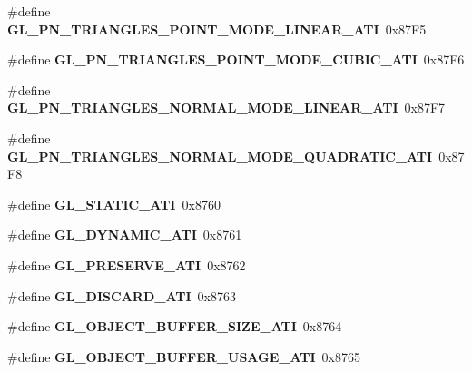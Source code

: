 \begin{DoxyCompactItemize}
\item 
\#define {\bfseries G\+L\+\_\+\+P\+N\+\_\+\+T\+R\+I\+A\+N\+G\+L\+E\+S\+\_\+\+P\+O\+I\+N\+T\+\_\+\+M\+O\+D\+E\+\_\+\+L\+I\+N\+E\+A\+R\+\_\+\+A\+T\+I}~0x87\+F5\label{_s_d_l__opengl_8h_a1f596fc0cb18f57d45c8eb519ce91455}

\item 
\#define {\bfseries G\+L\+\_\+\+P\+N\+\_\+\+T\+R\+I\+A\+N\+G\+L\+E\+S\+\_\+\+P\+O\+I\+N\+T\+\_\+\+M\+O\+D\+E\+\_\+\+C\+U\+B\+I\+C\+\_\+\+A\+T\+I}~0x87\+F6\label{_s_d_l__opengl_8h_ac5bbaf200b7029e667e3aa9766935be9}

\item 
\#define {\bfseries G\+L\+\_\+\+P\+N\+\_\+\+T\+R\+I\+A\+N\+G\+L\+E\+S\+\_\+\+N\+O\+R\+M\+A\+L\+\_\+\+M\+O\+D\+E\+\_\+\+L\+I\+N\+E\+A\+R\+\_\+\+A\+T\+I}~0x87\+F7\label{_s_d_l__opengl_8h_a1786c898dc9e78d8892f1287804a819a}

\item 
\#define {\bfseries G\+L\+\_\+\+P\+N\+\_\+\+T\+R\+I\+A\+N\+G\+L\+E\+S\+\_\+\+N\+O\+R\+M\+A\+L\+\_\+\+M\+O\+D\+E\+\_\+\+Q\+U\+A\+D\+R\+A\+T\+I\+C\+\_\+\+A\+T\+I}~0x87\+F8\label{_s_d_l__opengl_8h_a19cc33e316ba0774bb83b5a595eeda96}

\item 
\#define {\bfseries G\+L\+\_\+\+S\+T\+A\+T\+I\+C\+\_\+\+A\+T\+I}~0x8760\label{_s_d_l__opengl_8h_ae0a0d28ca09a0aa2f41d8eafb0a1651a}

\item 
\#define {\bfseries G\+L\+\_\+\+D\+Y\+N\+A\+M\+I\+C\+\_\+\+A\+T\+I}~0x8761\label{_s_d_l__opengl_8h_a8685b152c484ad0c1730a16f114691de}

\item 
\#define {\bfseries G\+L\+\_\+\+P\+R\+E\+S\+E\+R\+V\+E\+\_\+\+A\+T\+I}~0x8762\label{_s_d_l__opengl_8h_ac3931a18d55a4b1cb50ff8219ef6be6a}

\item 
\#define {\bfseries G\+L\+\_\+\+D\+I\+S\+C\+A\+R\+D\+\_\+\+A\+T\+I}~0x8763\label{_s_d_l__opengl_8h_a703dead2340f8d73cced27ea64df09e2}

\item 
\#define {\bfseries G\+L\+\_\+\+O\+B\+J\+E\+C\+T\+\_\+\+B\+U\+F\+F\+E\+R\+\_\+\+S\+I\+Z\+E\+\_\+\+A\+T\+I}~0x8764\label{_s_d_l__opengl_8h_a47668fc6d0e4914fab72354203a44f4f}

\item 
\#define {\bfseries G\+L\+\_\+\+O\+B\+J\+E\+C\+T\+\_\+\+B\+U\+F\+F\+E\+R\+\_\+\+U\+S\+A\+G\+E\+\_\+\+A\+T\+I}~0x8765\label{_s_d_l__opengl_8h_a3043243a3dc062880f80a4f738fc50f2}


\end{DoxyCompactItemize}
